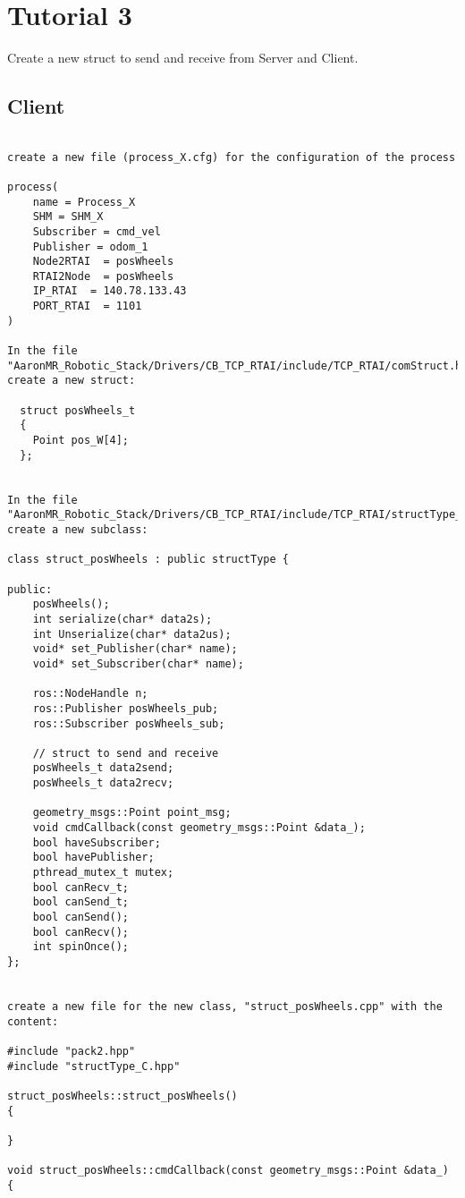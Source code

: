 \chapter*{Tutorial 3}

Create a new struct to send and receive from Server and Client.

\section{Client}
\begin{verbatim}

create a new file (process_X.cfg) for the configuration of the process

process(
	name = Process_X
	SHM = SHM_X
	Subscriber = cmd_vel
	Publisher = odom_1
 	Node2RTAI  = posWheels
	RTAI2Node  = posWheels
	IP_RTAI  = 140.78.133.43
	PORT_RTAI  = 1101
)

In the file "AaronMR_Robotic_Stack/Drivers/CB_TCP_RTAI/include/TCP_RTAI/comStruct.h" create a new struct:

  struct posWheels_t
  {
    Point pos_W[4];
  };


In the file "AaronMR_Robotic_Stack/Drivers/CB_TCP_RTAI/include/TCP_RTAI/structType_C.hpp", create a new subclass:

class struct_posWheels : public structType {

public:
    posWheels();
    int serialize(char* data2s);
    int Unserialize(char* data2us);
    void* set_Publisher(char* name);
    void* set_Subscriber(char* name);

    ros::NodeHandle n;
    ros::Publisher posWheels_pub;
    ros::Subscriber posWheels_sub;

    // struct to send and receive
    posWheels_t data2send;
    posWheels_t data2recv;

    geometry_msgs::Point point_msg;
    void cmdCallback(const geometry_msgs::Point &data_);
    bool haveSubscriber;
    bool havePublisher;
    pthread_mutex_t mutex;
    bool canRecv_t;
    bool canSend_t;
    bool canSend();
    bool canRecv();
    int spinOnce();
};


create a new file for the new class, "struct_posWheels.cpp" with the content:

#include "pack2.hpp"
#include "structType_C.hpp"

struct_posWheels::struct_posWheels()
{

}

void struct_posWheels::cmdCallback(const geometry_msgs::Point &data_)
{


\end{verbatim}
